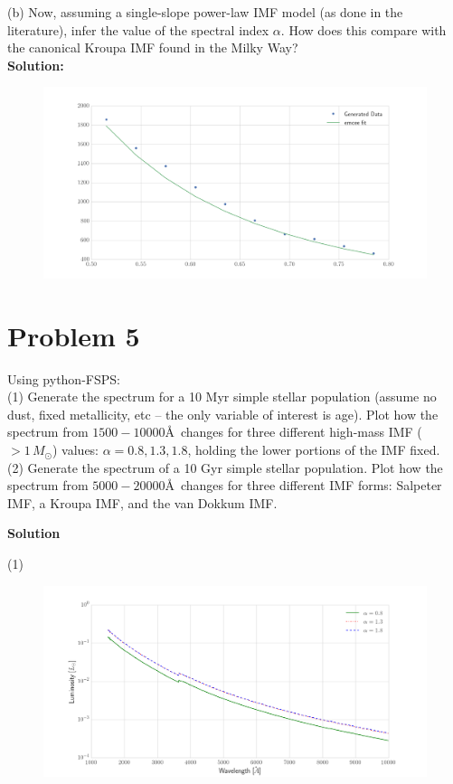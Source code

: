 \documentclass[12pt,usletter,english]{article}
\begin{document}
(b) Now, assuming a single-slope power-law IMF model (as done in the
literature), infer the value of the spectral index $\alpha$.  How does
this compare with the canonical Kroupa IMF found in the Milky Way?  \\

\noindent \textbf{Solution:}

\begin{figure}[!h]
  \centering \includegraphics[width=13cm]{lognormal.png}
  \caption{
    \label{fig:lognorm}}
\end{figure}


\section{Problem 5}
Using python-FSPS: \\

(1) Generate the spectrum for a 10 Myr simple stellar population
(assume no dust, fixed metallicity, etc -- the only variable of
interest is age). Plot how the spectrum from $1500- 10000$\AA\ changes
for three different high-mass IMF ($>1\, M_{\odot}$) values:
$\alpha=0.8, 1.3, 1.8$, holding the lower portions of the IMF fixed.
\\

(2) Generate the spectrum of a 10 Gyr simple stellar population.  Plot
how the spectrum from $5000-20000$\AA\ changes for three different IMF
forms: Salpeter IMF, a Kroupa IMF, and the van Dokkum IMF.

\noindent \textbf{Solution}

(1)

\begin{figure}[!h]
  \centering \includegraphics[width=13cm]{ssp_highmass_imf.png}
  \caption{
    \label{fig:ssphighmass}}
\end{figure}
\end{document}
